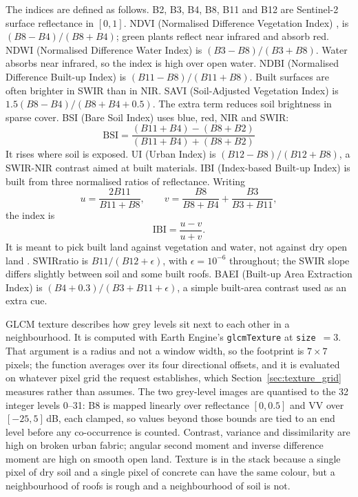 \documentclass[conference]{IEEEtran}
\begin{document}
The indices are defined as follows. B2, B3, B4, B8, B11 and B12 are Sentinel-2 surface reflectance in $[0,1]$. NDVI (Normalised Difference Vegetation Index) \cite{r1}, \cite{r2} is $(B8-B4)/(B8+B4)$; green plants reflect near infrared and absorb red. NDWI (Normalised Difference Water Index) \cite{r22} is $(B3-B8)/(B3+B8)$. Water absorbs near infrared, so the index is high over open water. NDBI (Normalised Difference Built-up Index) \cite{r21} is $(B11-B8)/(B11+B8)$. Built surfaces are often brighter in SWIR than in NIR. SAVI (Soil-Adjusted Vegetation Index) \cite{r24} is $1.5(B8-B4)/(B8+B4+0.5)$. The extra term reduces soil brightness in sparse cover. BSI (Bare Soil Index) \cite{r25} uses blue, red, NIR and SWIR:
\begin{equation}
\text{BSI} = \frac{(B11+B4)-(B8+B2)}{(B11+B4)+(B8+B2)}
\end{equation}
It rises where soil is exposed. UI (Urban Index) \cite{r29} is $(B12-B8)/(B12+B8)$, a SWIR-NIR contrast aimed at built materials. IBI (Index-based Built-up Index) \cite{r23} is built from three normalised ratios of reflectance. Writing
\begin{equation}
u = \frac{2B11}{B11+B8}, \qquad
v = \frac{B8}{B8+B4} + \frac{B3}{B3+B11},
\end{equation}
the index is
\begin{equation}
\text{IBI} = \frac{u - v}{u + v}.
\end{equation}
It is meant to pick built land against vegetation and water, not against dry open land \cite{r26}. SWIRratio is $B11/(B12+\epsilon)$, with $\epsilon = 10^{-6}$ throughout; the SWIR slope differs slightly between soil and some built roofs. BAEI (Built-up Area Extraction Index) \cite{r30} is $(B4+0.3)/(B3+B11+\epsilon)$, a simple built-area contrast used as an extra cue.

GLCM texture \cite{r20} describes how grey levels sit next to each other in a neighbourhood. It is computed with Earth Engine's \texttt{glcmTexture} at \texttt{size}~$=3$. That argument is a radius and not a window width, so the footprint is $7\times7$ pixels; the function averages over its four directional offsets, and it is evaluated on whatever pixel grid the request establishes, which Section~\ref{sec:texture_grid} measures rather than assumes. The two grey-level images are quantised to the 32 integer levels 0--31: B8 is mapped linearly over reflectance $[0, 0.5]$ and VV over $[-25, 5]$\,dB, each clamped, so values beyond those bounds are tied to an end level before any co-occurrence is counted. Contrast, variance and dissimilarity are high on broken urban fabric; angular second moment and inverse difference moment are high on smooth open land. Texture is in the stack because a single pixel of dry soil and a single pixel of concrete can have the same colour, but a neighbourhood of roofs is rough and a neighbourhood of soil is not.
\end{document}
